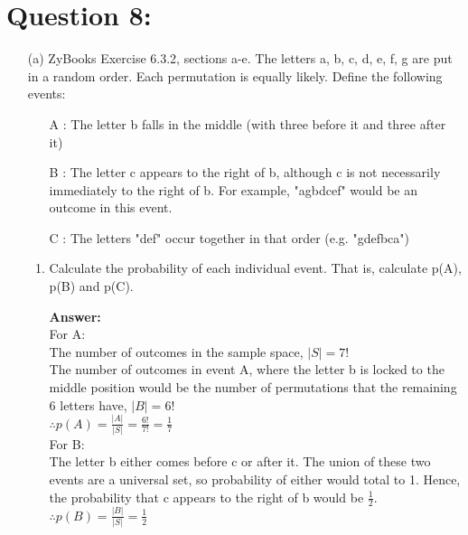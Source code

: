\documentclass[14pt]{extreport}
\newcommand{\answer}[0]{\medskip \textbf{Answer:} \medskip}
\begin{document}
\section*{Question 8:}

\begin{enumerate}[label=(\alph*)]
    
    \item[(a)] ZyBooks Exercise 6.3.2, sections a-e. The letters {a, b, c, d, e, f, g} are put in a random order. Each permutation is equally likely. Define the following events: 
    \begin{itemize}
        \item[A]: The letter b falls in the middle (with three before it and three after it)
        \item[B]: The letter c appears to the right of b, although c is not necessarily immediately to the right of b. For example, "agbdcef" would be an outcome in this event. 
        \item[C]: The letters "def" occur together in that order (e.g. "gdefbca")
    \end{itemize}
    
        \begin{enumerate}
            \item Calculate the probability of each individual event. That is, calculate p(A), p(B) and p(C). 
                
                \answer \\
                For A: \\
                The number of outcomes in the sample space, $|S| = 7!$\\
                The number of outcomes in event A, where the letter b is locked to the middle position would be the number of permutations that the remaining 6 letters have, $|B|=6!$\\
                $\therefore p(A) = \frac{|A|}{|S|} = \frac{6!}{7!} = \frac{1}{7}$\\
                
                For B:\\
                The letter b either comes before c or after it. The union of these two events are a universal set, so probability of either would total to 1. Hence, the probability that c appears to the right of b would be $\frac{1}{2}$. \\
                $\therefore p(B) = \frac{|B|}{|S|} = \frac{1}{2}$\\
                

\end{enumerate}
\end{enumerate}
\end{document}
